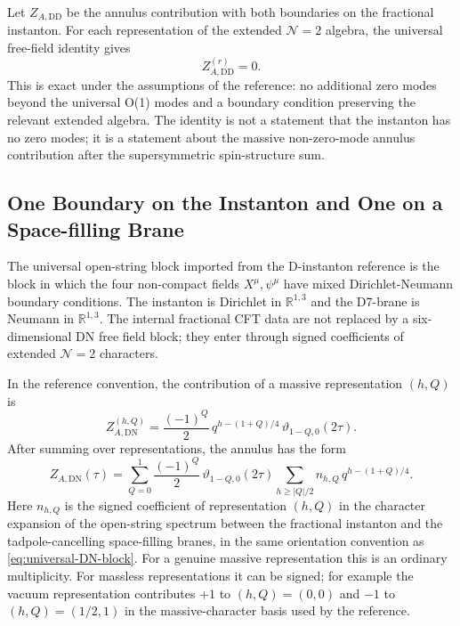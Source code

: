\documentclass[11pt]{article}
\newcommand{\R}{\mathbb{R}}
\newcommand{\DN}{\mathrm{DN}}
\newcommand{\DD}{\mathrm{DD}}
\newcommand{\vart}{\vartheta}
\begin{document}
Let $Z_{A,\DD}$ be the annulus contribution with both boundaries on the fractional instanton.
For each representation of the extended $\mathcal N=2$ algebra, the universal free-field
identity gives
\begin{equation}
  Z_{A,\DD}^{(r)}=0.
  \label{eq:DD-vanishing}
\end{equation}
This is exact under the assumptions of the reference: no additional zero modes beyond the
universal O(1) modes and a boundary condition preserving the relevant extended algebra. The
identity is not a statement that the instanton has no zero modes; it is a statement about the
massive non-zero-mode annulus contribution after the supersymmetric spin-structure sum.

\subsection{One Boundary on the Instanton and One on a Space-filling Brane}

The universal open-string block imported from the D-instanton reference is the block in which
the four non-compact fields $X^\mu,\psi^\mu$ have mixed Dirichlet-Neumann boundary
conditions. The instanton is Dirichlet in $\R^{1,3}$ and the D7-brane is Neumann in
$\R^{1,3}$. The internal fractional CFT data are not replaced by a six-dimensional DN free
field block; they enter through signed coefficients of extended $\mathcal N=2$ characters.

In the reference convention, the contribution of a massive representation $(h,Q)$ is
\begin{equation}
  Z_{A,\DN}^{(h,Q)}
  =
  \frac{(-1)^Q}{2}\,
  q^{h-(1+Q)/4}\,
  \vart_{1-Q,0}(2\tau).
  \label{eq:universal-DN-block}
\end{equation}
After summing over representations, the annulus has the form
\begin{equation}
  Z_{A,\DN}(\tau)
  =
  \sum_{Q=0}^{1}
  \frac{(-1)^Q}{2}\,
  \vart_{1-Q,0}(2\tau)
  \sum_{h\ge |Q|/2}
  n_{h,Q}\,
  q^{h-(1+Q)/4}.
  \label{eq:DN-annulus}
\end{equation}
Here $n_{h,Q}$ is the signed coefficient of representation $(h,Q)$ in the character expansion of
the open-string spectrum between the fractional instanton and the tadpole-cancelling
space-filling branes, in the same orientation convention as \eqref{eq:universal-DN-block}. For a
genuine massive representation this is an ordinary multiplicity. For massless representations it
can be signed; for example the vacuum representation contributes $+1$ to $(h,Q)=(0,0)$ and $-1$
to $(h,Q)=(1/2,1)$ in the massive-character basis used by the reference.
\end{document}
